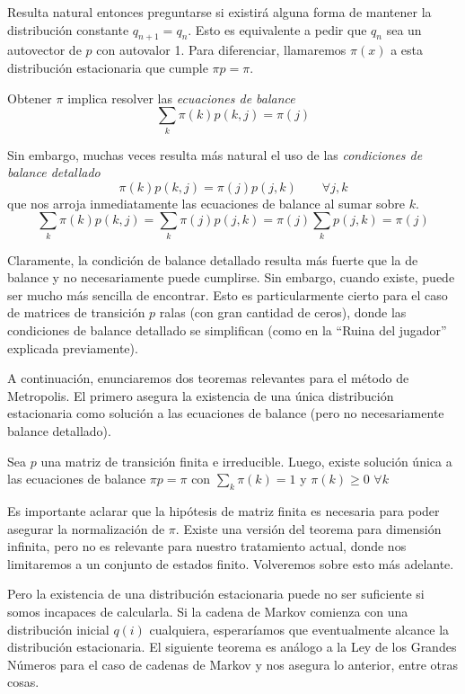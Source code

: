 Resulta natural entonces preguntarse si existirá alguna forma de mantener la distribución constante $q_{n+1} = q_n$.
Esto es equivalente a pedir que $q_n$ sea un autovector de $p$ con autovalor 1.
Para diferenciar, llamaremos $\pi(x)$ a esta distribución estacionaria que cumple $\pi p = \pi$.

Obtener $\pi$ implica resolver las \textit{ecuaciones de balance}
\[ \sum_k \pi(k) p(k, j) = \pi(j) \]

Sin embargo, muchas veces resulta más natural el uso de las \textit{condiciones de balance detallado}
\[ \pi(k) p(k, j) = \pi(j)p(j, k) \qquad \forall j,k \]
que nos arroja inmediatamente las ecuaciones de balance al sumar sobre $k$.
\[ \sum_k \pi(k) p(k, j) = \sum_k \pi(j)p(j, k) = \pi(j) \sum_k p(j,k) = \pi(j) \]

Claramente, la condición de balance detallado resulta más fuerte que la de balance y no necesariamente puede cumplirse.
Sin embargo, cuando existe, puede ser mucho más sencilla de encontrar.
Esto es particularmente cierto para el caso de matrices de transición $p$ ralas (con gran cantidad de ceros), donde las condiciones de balance detallado se simplifican (como en la ``Ruina del jugador'' explicada previamente).

A continuación, enunciaremos dos teoremas relevantes para el método de Metropolis\cite[pp. 26]{BOOK:DURRET}.
El primero asegura la existencia de una única distribución estacionaria como solución a las ecuaciones de balance (pero no necesariamente balance detallado).

\begin{theorem}
 Sea $p$ una matriz de transición finita e irreducible. Luego, existe solución única a las ecuaciones de balance $\pi p = \pi$ con $\sum_k \pi(k) = 1$ y $\pi(k)\geq 0$ $\forall k$
\end{theorem}

Es importante aclarar que la hipótesis de matriz finita es necesaria para poder asegurar la normalización de $\pi$.
Existe una versión del teorema para dimensión infinita, pero no es relevante para nuestro tratamiento actual, donde nos limitaremos a un conjunto de estados finito.
Volveremos sobre esto más adelante.

Pero la existencia de una distribución estacionaria puede no ser suficiente si somos incapaces de calcularla.
Si la cadena de Markov comienza con una distribución inicial $q(i)$ cualquiera, esperaríamos que eventualmente alcance la distribución estacionaria.
El siguiente teorema es análogo a la Ley de los Grandes Números para el caso de cadenas de Markov y nos asegura lo anterior, entre otras cosas.

